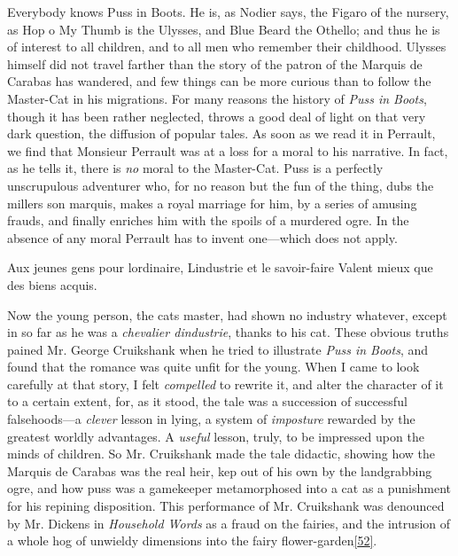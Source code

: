 \documentclass[14pt,a4paper]{memoir}
\begin{document}
Everybody knows Puss in Boots. He is, as Nodier says, the Figaro of the
nursery, as Hop o\textquotesingle{} My Thumb is the Ulysses, and Blue
Beard the Othello; and thus he is of interest to all children, and to
all men who remember their childhood. Ulysses himself did not travel
farther than the story of the patron of the Marquis de Carabas has
wandered, and few things can be more curious than to follow the
Master-Cat in his migrations. For many reasons the history of \emph{Puss
in Boots}, though it has been rather neglected, throws a good deal of
light on that very dark question, the diffusion of popular tales. As
soon as we read it in Perrault, we find that Monsieur Perrault was at a
loss for a moral to his narrative. In fact, as he tells it, there is
\emph{no} moral to the Master-Cat. Puss is a perfectly unscrupulous
adventurer who, for no reason but the fun of the thing, dubs the
miller\textquotesingle s son marquis, makes a royal marriage for him, by
a series of amusing frauds, and finally enriches him with the spoils of
a murdered ogre. In the absence of any moral Perrault has to invent
one---which does not apply.

{\textquotesingle Aux jeunes gens pour l\textquotesingle ordinaire,}
{L\textquotesingle industrie et le savoir-faire} {Valent mieux que des
biens acquis.\textquotesingle{}}

Now the \textquotesingle young person,\textquotesingle{} the
cat\textquotesingle s master, had shown no
\textquotesingle industry\textquotesingle{} whatever, except in so far
as he was a \emph{chevalier d\textquotesingle industrie}, thanks to his
cat. These obvious truths pained Mr. George Cruikshank when he tried to
illustrate \emph{Puss in Boots}, and found that the romance was quite
unfit for the young. \textquotesingle When I came to look carefully at
that story, I felt \emph{compelled} to rewrite it, and alter the
character of it to a certain extent, for, as it stood, the tale was a
succession of successful falsehoods---a \emph{clever} lesson in lying, a
system of \emph{imposture} rewarded by the greatest worldly advantages.
A \emph{useful} lesson, truly, to be impressed upon the minds of
children.\textquotesingle{} So Mr. Cruikshank made the tale didactic,
showing how the Marquis de Carabas was the real heir,
\textquotesingle kep\textquotesingle{} out of his own\textquotesingle{}
by the landgrabbing ogre, and how puss was a gamekeeper metamorphosed
into a cat as a punishment for his repining disposition. This
performance of Mr. Cruikshank was denounced by Mr. Dickens in
\emph{Household Words} as a \textquotesingle fraud on the
fairies,\textquotesingle{} and \textquotesingle the intrusion of a whole
hog of unwieldy dimensions into the fairy
flower-garden\protect\hypertarget{4533318093929944247_33931-h-0.htm.xhtmlux5cux23FNanchor_52}{}{}\protect\hyperlink{4533318093929944247_33931-h-1.htm.xhtmlux5cux23Footnote_52}{{[}52{]}}.\textquotesingle{}
\end{document}
